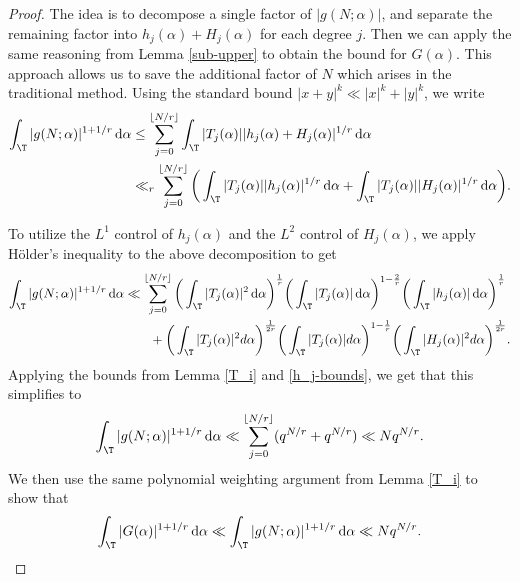 \documentclass[reqno,11pt]{amsart}
\theoremstyle{definition}
\theoremstyle{remark}
\numberwithin{equation}{section}
\renewcommand{\d}{\,{\rm d}} %
\newcommand{\<}{\begin{equation}}
\renewcommand{\>}{\end{equation}}
\begin{document}
\begin{proof}
    The idea is to decompose a single factor of $|g(N;\alpha)|$, and separate the remaining factor into $h_j(\alpha)+H_j(\alpha)$ for each degree $j$. Then we can apply the same reasoning from Lemma \ref{sub-upper} to obtain the bound for $G(\alpha)$. This approach allows us to save the additional factor of $N$ which arises in the traditional method. Using the standard bound $|x+y|^k \ll |x|^k+|y|^k$, we write
    \begin{align*}
        \int_\T |g(N;\alpha)|^{1+1/r}\d\alpha &\leq \sum_{j=0}^{\lfloor N/r \rfloor} \int_\T |T_j(\alpha)||h_j(\alpha)+H_j(\alpha)|^{1/r}\d\alpha \\
        &\ll_r \sum_{j=0}^{\lfloor N/r\rfloor} \bigg(\int_\T |T_j(\alpha)||h_j(\alpha)|^{1/r}\d\alpha + \int_\T |T_j(\alpha)||H_j(\alpha)|^{1/r}\d\alpha\bigg).
    \end{align*}
    
    To utilize the $L^1$ control of $h_j(\alpha)$ and the $L^2$ control of $H_j(\alpha)$, we apply H\"older's inequality to the above decomposition to get
    \begin{align*}
        \int_\T |g(N;\alpha)|^{1+1/r}\d\alpha &\ll \sum_{j=0}^{\lfloor N/r\rfloor} \bigg(\int_\T |T_j(\alpha)|^2\d\alpha\bigg)^{\frac{1}{r}}\bigg(\int_\T |T_j(\alpha)|\d\alpha\bigg)^{1-\frac{2}{r}}\bigg(\int_\T|h_j(\alpha)|\d\alpha\bigg)^{\frac{1}{r}} \\
        &\qquad + \bigg(\int_\T |T_j(\alpha)|^2d\alpha\bigg)^{\frac{1}{2r}}\bigg(\int_\T |T_j(\alpha)|d\alpha\bigg)^{1-\frac{1}{r}}\bigg(\int_\T|H_j(\alpha)|^{2}d\alpha\bigg)^{\frac{1}{2r}}.
    \end{align*}
    Applying the bounds from Lemma \ref{T_i} and \eqref{h_j-bounds}, we get that this simplifies to
    \[\int_\T |g(N;\alpha)|^{1+1/r}\d\alpha \ll \sum_{j=0}^{\lfloor N/r \rfloor} (q^{N/r}+q^{N/r}) \ll Nq^{N/r}.\]
    We then use the same polynomial weighting argument from Lemma \ref{T_i} to show that
    \[\int_\T |G(\alpha)|^{1+1/r} \d\alpha \ll \int_\T |g(N;\alpha)|^{1+1/r} \d\alpha \ll Nq^{N/r}. \qedhere\]
\end{proof}
\end{document}
